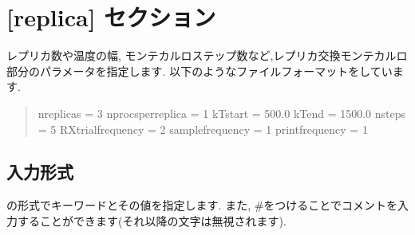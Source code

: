 \documentclass[letterpaper,10pt,dvipdfmx]{sphinxmanual}
\begin{document}
\section{{[}replica{]} セクション}
\label{\detokenize{file_specification/parameter_replica:replica}}\label{\detokenize{file_specification/parameter_replica::doc}}
レプリカ数や温度の幅, モンテカルロステップ数など,レプリカ交換モンテカルロ部分のパラメータを指定します.
以下のようなファイルフォーマットをしています.
\begin{quote}

\begin{sphinxVerbatim}[commandchars=\\\{\}]
[replica]
nreplicas = 3
nprocs\PYGZus{}per\PYGZus{}replica = 1
kTstart = 500.0
kTend = 1500.0
nsteps = 5
RXtrial\PYGZus{}frequency = 2
sample\PYGZus{}frequency = 1
print\PYGZus{}frequency = 1
\end{sphinxVerbatim}
\end{quote}


\subsection{入力形式}
\label{\detokenize{file_specification/parameter_replica:id1}}
 の形式でキーワードとその値を指定します.
また, \#をつけることでコメントを入力することができます(それ以降の文字は無視されます).
\end{document}
